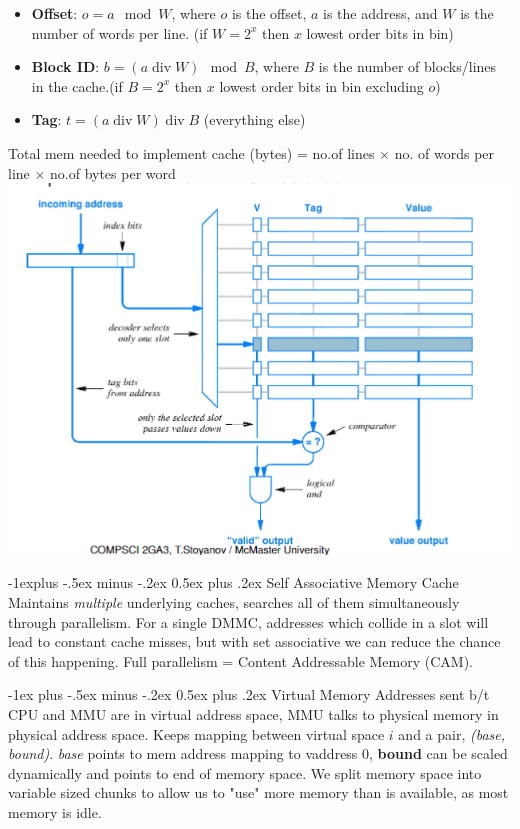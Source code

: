 \documentclass[letterpaper, 8pt]{extarticle}
\makeatletter
\renewcommand{\section}{\@startsection{section}{1}{0mm}%
                                {-1ex plus -.5ex minus -.2ex}%
                                {0.5ex plus .2ex}%
                                {\normalfont\normalsize\bfseries}}
\renewcommand{\subsection}{\@startsection{subsection}{2}{0mm}%
                                {-1explus -.5ex minus -.2ex}%
                                {0.5ex plus .2ex}%
                                {\normalfont\small\bfseries}}
\DeclareMathOperator{\divv}{div}
\makeatother
\begin{document}
\begin{multicols*}{6}
\begin{itemize}
    \item \textbf{Offset}: $o = a \mod W$, where $o$ is the offset, $a$ is the address, and $W$ is the number of words per line. (if $W = 2^x$ then $x$ lowest order bits in bin)
    \item \textbf{Block ID}: $b = (a \divv W) \mod B$, where $B$ is the number of blocks/lines in the cache.(if $B = 2^x$ then $x$ lowest order bits in bin excluding $o$)
    \item \textbf{Tag}: $t = (a \divv W) \divv B$ (everything else)
\end{itemize}
Total mem needed to implement cache (bytes) = no.of lines $\times$ no. of words per line $\times$ no.of bytes per word
\includegraphics[width=\linewidth]{DMMC_hardware.png}

\subsection{Self Associative Memory Cache}
Maintains \textit{multiple} underlying caches, searches all of them simultaneously through parallelism.
For a single DMMC, addresses which collide in a slot will lead to constant cache misses, but with set associative we can reduce the chance of this happening.
Full parallelism = Content Addressable Memory (CAM).

\section{Virtual Memory}
Addresses sent b/t CPU and MMU are in virtual address space, MMU talks to physical memory in physical address space.
Keeps mapping between virtual space $i$ and a pair, \textit{(base, bound)}.
\textit{base} points to mem address mapping to vaddress 0, \textbf{bound} can be scaled dynamically and points to end of memory space.
We split memory space into variable sized chunks to allow us to "use" more memory than is available, as most memory is idle.


\end{multicols*}
\end{document}
